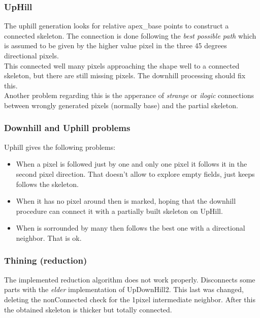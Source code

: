 \documentclass{article}
\begin{document}
\subsubsection{UpHill}

The uphill generation looks for relative apex\_base points to construct a connected
skeleton. The connection is done following the \emph{best possible path} which is 
assumed to be given by the higher value pixel in the three 45 degrees directional pixels.\\
This connected well many pixels approaching the shape well to a connected skeleton, but there
are still missing pixels. The downhill processing should fix this.\\

Another problem regarding this is the apperance of \emph{strange} or \emph{ilogic} connections
between wrongly generated pixels (normally base) and the partial skeleton.\\

\subsubsection{Downhill and Uphill problems}
Uphill gives the following problems: 
\begin{itemize}
\item When a pixel is followed just by one and only one pixel it follows
it in the second pixel direction. That doesn't allow to explore empty
fields, just keeps follows the skeleton. 

\item When it has no pixel around then is marked, hoping that the downhill
procedure can connect it with a partially built skeleton on UpHill.

\item When is sorrounded by many then follows the best one with a directional
neighbor. That is ok.


\end{itemize}

\subsubsection{Thining (reduction)}
The implemented reduction algorithm does not work properly. Disconnects
some parts with the \emph{elder} implementation of UpDownHill2. This
last was changed, deleting the nonConnected check for the 1pixel intermediate
neighbor. After this the obtained skeleton is thicker but totally connected.\\
\end{document}
